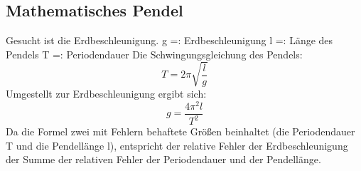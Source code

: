 \subsection{Mathematisches Pendel}
Gesucht ist die Erdbeschleunigung.
\newline
g =: Erdbeschleunigung
\newline
l =: Länge des Pendels
\newline
T =: Periodendauer
\newline
Die Schwingungsgleichung des Pendels:
\begin{equation}
T = 2\pi \sqrt{\frac{l}{g}}
\end{equation}
Umgestellt zur Erdbeschleunigung ergibt sich:
\begin{equation}
g = \frac{4\pi^{2}l}{T^{2}}
\end{equation}
Da die Formel zwei mit Fehlern behaftete Größen beinhaltet (die Periodendauer T und die Pendellänge l), entspricht der relative Fehler der Erdbeschleunigung der Summe der relativen Fehler der Periodendauer und der Pendellänge.
\begin{table}[thb]
	\centering
	\hline
\end{table}

%    

